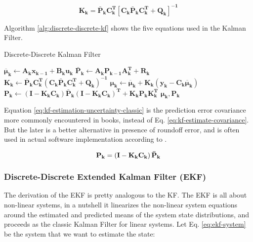 \documentclass[12pt]{article}
\newcommand{\bvec}[1]{\boldsymbol{\mathbf{#1}}} %
\newcommand{\mat}[1]{\boldsymbol{\mathbf{#1}}}
\newcommand{\matT}[1]{\boldsymbol{\mathbf{#1^T}}}
\newcommand{\brac}[1]{\left[#1\right]} %
\newcommand{\parentheses}[1]{\left(#1\right)}
\newcommand{\mb}[1]{{\boldsymbol{#1}}} %
\begin{document}
\begin{equation}
    \mat{K_k} = \mat{\bar{P}_k}\matT{C_k} \brac{\mat{C_k}\mat{\bar{P}_k}\matT{C_k} + \mat{Q_k}}^\mathbf{-1}
    \label{eq:kf-gain}
\end{equation}

Algorithm \ref{alg:discrete-discrete-kf} shows the five equations used in the Kalman Filter.
\begin{algorithm}[h]
\caption{Discrete-Discrete Kalman Filter}
\label{alg:discrete-discrete-kf}
\begin{algorithmic}[1]
\Procedure{Kalman Filter}{$\mb{\mu}_\mathbf{k-1}, \mat{P_{k-1}}, \bvec{u_k}, \bvec{y_k}$}
\State $\mb{\overline{\mu}}_\mathbf{k} \gets \mat{A_k}\bvec{x_{k-1}} + \mat{B_k}\bvec{u_k}$ 
\State $\mat{\bar{P}_k} \gets \mat{A_k P_{k-1} A^T_k + R_k}$ 
\State $\mat{K_k} \gets \mat{\bar{P}_k C^T_k \parentheses{C_k \bar{P}_k C^T_k + Q_k}^{-1}}$ 
\State $\mb{\mu}_\mathbf{k} \gets \mb{\overline{\mu}}_\mathbf{k} + \mat{K_k} \parentheses{\bvec{y_k} - \mat{C_k}\mb{\overline{\mu}}_\mathbf{k}}$ 
\State $\mat{P_k} \gets \parentheses{\mat{I} - \mat{K_k C_k}}\mat{\bar{P}_k} \parentheses{\mat{I} - \mat{K_k C_k}}^\mathbf{T} + \mat{K_k P_k K_k^T}$ 
\State \Return $\mb{\mu}_\mathbf{k}, \mat{P_k}$
\EndProcedure
\end{algorithmic}
\end{algorithm}

Equation \ref{eq:kf-estimation-uncertainty-classic} is the prediction error covariance more commonly encountered in books, instead of Eq. \ref{eq:kf-estimate-covariance}. But the later is a better alternative in presence of roundoff error, and is often used in actual software implementation according to \cite[p.~ 73]{lewis2017optimal}.

\begin{equation}
    \mat{P_k} = \parentheses{\mat{I} - \mat{K_k C_k}}\mat{\Bar{P}_k}
    \label{eq:kf-estimation-uncertainty-classic}
\end{equation}

\subsubsection{Discrete-Discrete Extended Kalman Filter (EKF)}
The derivation of the EKF is pretty analogous to the KF. The EKF is all about 
non-linear systems, in a nutshell it linearizes the non-linear system equations 
around the estimated and predicted means of the system state distributions, and 
proceeds as the classic Kalman Filter for linear systems.
Let Eq. \ref{eq:ekf-system} be the system that we want to estimate the state:
\end{document}
